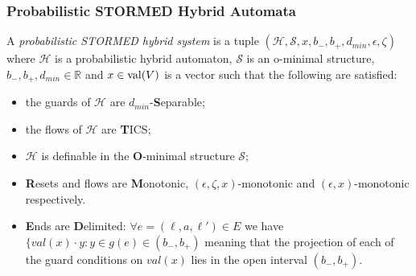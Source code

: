 
\subsubsection{Probabilistic STORMED Hybrid Automata}
\begin{defi}
A \emph{probabilistic STORMED hybrid system} is a tuple $(\mathcal{H},\mathcal{S},x,b_{-},b_{+},d_{min},\epsilon,\zeta)$ where $\mathcal{H}$ is a probabilistic hybrid automaton, $\mathcal{S}$ is an o-minimal structure, $b_{-},b_{+},d_{min}\in\mathbb{R}$ and $x\in \operatorname{val}(V)$ is a vector such that the following are satisfied:
\begin{itemize}
    \item the guards of $\mathcal{H}$ are $d_{min}$-\textbf{S}eparable;
    \item the flows of $\mathcal{H}$ are \textbf{T}ICS;
    \item $\mathcal{H}$ is definable in the \textbf{O}-minimal structure $\mathcal{S}$;
    \item \textbf{R}esets and flows are \textbf{M}onotonic, $(\epsilon,\zeta,x)$-monotonic and $(\epsilon,x)$-monotonic respectively.
    \item \textbf{E}nds are \textbf{D}elimited: $\forall e=(\ell,a,\ell')\in E$ we have
    $\{val(x)\cdot y : y\in g(e)\in(b_{-},b_{+})$ meaning that the projection of each of the guard conditions on $val(x)$ lies in the open interval $(b_{-},b_{+})$.
\end{itemize}
\end{defi}

